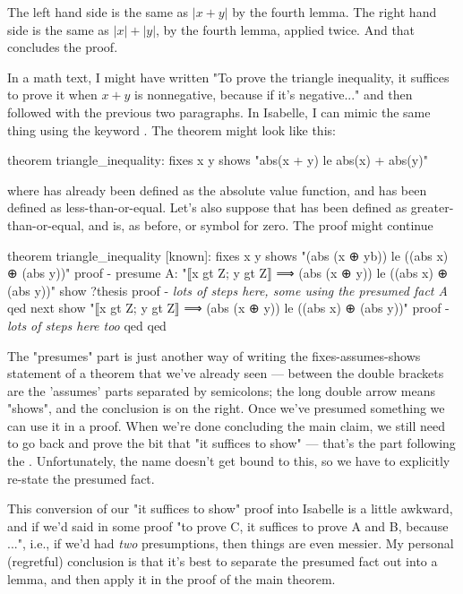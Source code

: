 The left hand side is the same as $|x+y|$ by the fourth lemma. The right hand side is the same as $|x| + |y|$, by the fourth lemma, applied twice. And that concludes the proof. 

In a math text, I might have written "To prove the triangle inequality, it suffices to prove it when $x + y$ is nonnegative, because if it's negative..." and then followed with the previous two paragraphs. In Isabelle, I can mimic the same thing using the keyword . The theorem might look like this:
\begin{IS}
theorem triangle_inequality:
  fixes x y
  shows "abs(x + y) le abs(x) + abs(y)"
\end{IS}
where  has already been defined as the absolute value function, and  has been defined as less-than-or-equal. Let's also suppose that  has been defined as greater-than-or-equal, and  is, as before, or symbol for zero. The proof might continue
\begin{IS}
theorem triangle_inequality [known]:
  fixes x y
  shows "(abs (x ⊕ yb)) le  ((abs x)  ⊕ (abs y))"
proof -
  presume A: "⟦x gt Z; y gt Z⟧ ⟹ (abs (x ⊕ y)) le  ((abs x)  ⊕ (abs y))"
  show ?thesis  
  proof -
    \textit{lots of steps here, some using the presumed fact A}
  qed 
next
  show "⟦x gt Z; y gt Z⟧ ⟹ (abs (x ⊕ y)) le  ((abs x)  ⊕ (abs y))"
  proof -
     \textit{lots of steps here too}
  qed
qed
\end{IS}

The "presumes" part is just another way of writing the fixes-assumes-shows statement of a theorem that we've already seen --- between the double brackets are the 'assumes' parts separated by semicolons; the long double arrow means "shows", and the conclusion is on the right. Once we've presumed something
we can use it in a proof. When we're done concluding the main claim, we still need to go back and prove the bit that "it suffices to show" --- that's the part following the . Unfortunately, the name  doesn't get bound to this, so we have to explicitly re-state the presumed fact. 

This conversion of our "it suffices to show" proof into Isabelle is a little awkward, and if we'd said in some proof "to prove C, it suffices to prove A and B, because ...", i.e., if we'd had \textit{two} presumptions, then things are even messier. My personal (regretful) conclusion is that it's best to separate the presumed fact out into a lemma, and then apply it in the proof of the main theorem. 

